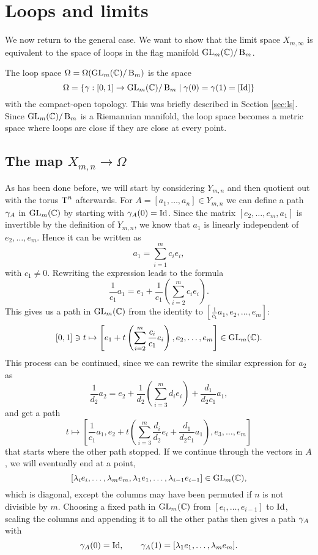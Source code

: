
\chapter{Loops and limits} 
\label{chap:loekker}

We now return to the general case. We want to show that the limit
space
$X_{m,\infty}$ is equivalent to the space of loops in the flag
manifold $\operatorname{GL}_{m}(\mathbb{C})/\operatorname{B}_{m}$.

\begin{definition}
  The loop space $\Omega = \Omega(\operatorname{GL}_{m}(\mathbb{C})/\operatorname{B}_{m})$ is the space
  \[ \Omega = \left\{ \gamma : [0,1] \to \operatorname{GL}_{m}(\mathbb{C})/\operatorname{B}_{m} \mid \gamma(0) = \gamma(1) =
    [\operatorname{Id}] \right\} \]
  with the compact-open topology. This was briefly described in
  Section \ref{sec:ls}. Since $\operatorname{GL}_{m}(\mathbb{C})/\operatorname{B}_{m}$ is a Riemannian manifold, the
  loop space becomes a metric space where loops are close if they are
  close at every point.
\end{definition}

\section{The map $X_{m,n}\to\Omega$}

As has been done before, we will start by considering $Y_{m,n}$ and
then quotient out with the torus $\operatorname{T}^n$ afterwards.
For $A = [a_1,\dots,a_n]\in Y_{m,n}$ we
can define a path $ \gamma_A$ in $\operatorname{GL}_m(\mathbb{C})$ by starting with
$\gamma_A(0) = \operatorname{Id}$. Since the matrix $[e_2,\dots,e_m,a_1]$ is
invertible by the definition of $Y_{m,n}$, we know that $a_1$ is
linearly independent of $e_2,\dots,e_m$. Hence it can be written as
\[ a_1 = \sum_{i=1}^m c_i e_i, \]
with $c_1 \neq 0$. Rewriting the expression leads to the formula
\[  \frac{1}{c_1} a_1= e_1 + \frac{1}{c_1} \left(\sum_{i=2}^m c_i
  e_i\right). \]
This gives us a path in $\operatorname{GL}_m(\mathbb{C})$ from the identity to
$\left[\frac{1}{c_1} a_1,e_2,\dots,e_m\right]$:
\[ [0,1]\ni t \mapsto \left[ e_1 + t\left(\sum_{i=2}^m
    \frac{c_i}{c_1}e_i\right),e_2,\dots,e_m \right] \in \operatorname{GL}_m(\mathbb{C}). \]
This process can be continued, since we can rewrite the similar
expression for $a_2$ as
\[ \frac{1}{d_2}a_2 = e_2 + \frac{1}{d_2}\left(\sum_{i=3}^m d_i
  e_i\right) + \frac{d_1}{d_2c_1}a_1, \]
and get a path
\[ t\mapsto \left[\frac{1}{c_1}a_1,e_2+t\left(\sum_{i=3}^m
    \frac{d_i}{d_2}e_i +
    \frac{d_1}{d_2c_1}a_1\right),e_3,\dots,e_m\right] \]
that starts where the other path stopped. If we continue through the
vectors in $A$, we will eventually end at a point,
\[ [\lambda_i e_i,\dots,\lambda_me_m,\lambda_1e_1,\dots,\lambda_{i-1}e_{i-1}]\in \operatorname{GL}_m(\mathbb{C}), \]
which is diagonal, except the columns may have been
permuted if $n$ is not divisible by $m$. Choosing a fixed path in
$\operatorname{GL}_m(\mathbb{C})$ from $[e_i,\dots,e_{i-1}]$ to $\operatorname{Id}$, scaling the columns and
appending it to all the other paths then gives a path $ \gamma_A$ with
\[  \gamma_A(0) = \operatorname{Id}, \qquad \gamma_A(1) =
[\lambda_1e_1,\dots,\lambda_me_m]. \]

